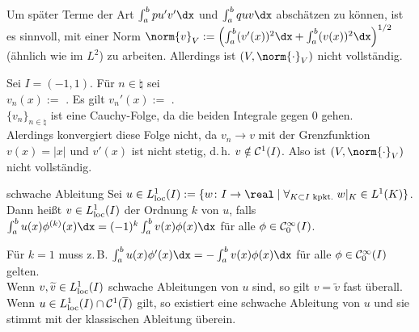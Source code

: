 \begin{Bem}
    Um später Terme der Art $\int_a^b pu'v'\dx$ und $\int_a^b quv\dx$
    abschätzen zu können, ist es sinnvoll, mit einer Norm
    $\norm{v}_V := \left(\int_a^b (v'(x))^2\dx +
    \int_a^b (v(x))^2\dx\right)^{1/2}$ (ähnlich wie im $L^2$) zu arbeiten.
    Allerdings ist $(V, \norm{\cdot}_V)$ nicht vollständig.
\end{Bem}

\begin{Bsp}
    Sei $I = (-1, 1)$.
    Für $n \in \natural$ sei\\
    $v_n(x) :=$ \matrixsize{$\begin{cases}
    -x & x \in [-1, -1/n] \\
    1/2 \cdot nx^2 + 1/(2n) & x \in \left]-1/n, 1/n\right] \\
    x & x \in \left]1/n, 1\right]\end{cases}$}.
    Es gilt $v_n'(x) :=$ \matrixsize{$\begin{cases}
    -1 & x \in [-1, -1/n] \\
    nx & x \in \left]-1/n, 1/n\right] \\
    1 & x \in \left]1/n, 1\right]\end{cases}$}.\\
    $\{v_n\}_{n \in \natural}$ ist eine Cauchy-Folge, da die
    beiden Integrale gegen $0$ gehen.\\
    Alerdings konvergiert diese Folge nicht, da
    $v_n \to v$ mit der Grenzfunktion $v(x) = |x|$
    und $v'(x)$ ist nicht stetig, d.\,h. $v \notin \mathcal{C}^1(I)$.
    Also ist $(V, \norm{\cdot}_V)$ nicht vollständig.
\end{Bsp}

\linie
\pagebreak

\begin{Def}{schwache Ableitung}
    Sei $u \in L^1_\loc(I) := \{w\colon I \rightarrow \real \;|\;
    \forall_{K \subset I \text{ kpkt.}}\; w|_K \in L^1(K)\}$.\\
    Dann heißt $v \in L^1_{{\text{loc}}}(I)$  der Ordnung $k$
    von $u$, falls\\
    $\int_a^b u(x)\phi^{(k)}(x)\dx =
    (-1)^k \int_a^b v(x)\phi(x)\dx$ für alle $\phi \in \mathcal{C}_0^\infty(I)$.
\end{Def}

\begin{Bem}
    Für $k = 1$ muss z.\,B.
    $\int_a^b u(x)\phi'(x)\dx = -\int_a^b v(x)\phi(x)\dx$
    für alle $\phi \in \mathcal{C}_0^\infty(I)$ gelten.\\
    Wenn $v, \widetilde{v} \in L^1_{{\text{loc}}}(I)$ schwache Ableitungen von $u$ sind,
    so gilt $v = \widetilde{v}$ fast überall.\\
    Wenn $u \in L^1_{{\text{loc}}}(I) \cap \mathcal{C}^1(\overline{I})$ gilt, so existiert eine
    schwache Ableitung von $u$ und sie stimmt mit der klassischen Ableitung
    überein.
\end{Bem}

